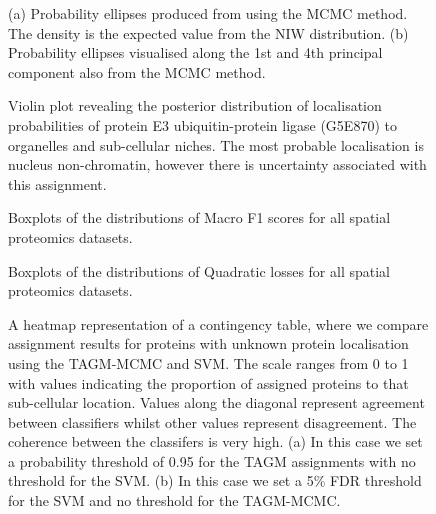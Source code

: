 \documentclass[10pt,letterpaper]{article}\usepackage[]{graphicx}\usepackage[]{color}
\begin{document}
\begin{figure}[!p]
  \begin{subfigure}[t]{0.45\textwidth}
        \centering

\end{subfigure}%
\hfill
\begin{subfigure}[t]{0.45\textwidth}

        \centering
\end{subfigure}
  \centering
  \caption{(a) Probability ellipses produced from using the MCMC
    method.  The density is the expected value from the NIW
    distribution. (b) Probability ellipses visualised along the 1st
    and 4th principal component also from the MCMC method.}
\label{figure::pcaellipseMCMC}
\end{figure}

\begin{figure}[!p]
\centering


\caption{Violin plot revealing the posterior distribution of
  localisation probabilities of protein E3 ubiquitin-protein ligase
  (G5E870) to organelles and sub-cellular niches.  The most probable
  localisation is nucleus non-chromatin, however there is uncertainty
  associated with this assignment.}
\label{fig:G5E870}
\end{figure}

\begin{figure}[!p]
  \centering

 \caption{Boxplots of the distributions of Macro F1 scores for all
   spatial proteomics datasets.}
  \label{figure::f1scores}
\end{figure}

\begin{figure}[!p]
  \centering

\caption{Boxplots of the distributions of Quadratic losses for all
  spatial proteomics datasets.}
  \label{figure::quadloss}
\end{figure}

\begin{figure}[!p]
  \begin{subfigure}[t]{0.5\textwidth}
        \centering


\end{subfigure}%
\begin{subfigure}[t]{0.5\textwidth}
\centering

\end{subfigure}
\caption{A heatmap representation of a contingency table, where we
  compare assignment results for proteins with unknown protein
  localisation using the TAGM-MCMC and SVM. The scale ranges from 0 to
  1 with values indicating the proportion of assigned proteins to that
  sub-cellular location. Values along the diagonal represent agreement
  between classifiers whilst other values represent disagreement. The
  coherence between the classifers is very high.  (a) In this case we
  set a probability threshold of 0.95 for the TAGM assignments with no
  threshold for the SVM.  (b) In this case we set a 5\% FDR threshold
  for the SVM and no threshold for the TAGM-MCMC.}
\label{figure:contigencytables}
\end{figure}
\end{document}
